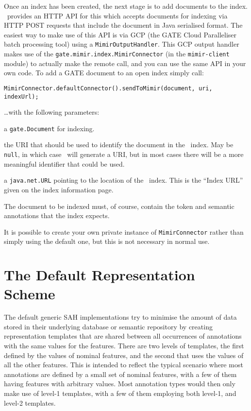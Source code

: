 Once an index has been created, the next stage is to add documents to the
index.  \Mimir\ provides an HTTP API for this which accepts documents for
indexing via HTTP POST requests that include the document in Java serialised
format.  The easiest way to make use of this API is via GCP (the GATE Cloud
Paralleliser batch processing tool) using a \lstinline!MimirOutputHandler!.
This GCP output handler makes use of the
\lstinline!gate.mimir.index.MimirConnector! (in the {\tt mimir-client} module)
to actually make the remote call, and you can use the same API in your own
code.  To add a GATE document to an open index simply call:
\begin{lstlisting}[breaklines]
MimirConnector.defaultConnector().sendToMimir(document, uri, indexUrl);
\end{lstlisting}
%
\ldots{}with the following parameters:
\bde
\item[document] a \lstinline!gate.Document! for indexing.
\item[uri] the URI that should be used to identify the document in the \Mimir\
  index.  May be \lstinline!null!, in which case \Mimir\ will generate a URI,
  but in most cases there will be a more meaningful identifier that could be
  used.
\item[indexUrl] a \lstinline!java.net.URL! pointing to the location of the
  \Mimir\ index.  This is the ``Index URL'' given on the index information page.
\ede

The document to be indexed must, of course, contain the token and semantic
annotations that the index expects.

It is possible to create your own private instance of
\lstinline!MimirConnector! rather than simply using the default one, but this
is not necessary in normal use.

\section{The Default Representation Scheme}\label{sec:indexing:dsah-detail}

The default generic SAH implementations try to minimise the amount of data
stored in their underlying database or semantic repository by creating
representation templates that are shared between all occurrences of annotations
with the same values for the features. There are two levels of templates, the
first defined by the values of nominal features, and the second that uses the
values of all the other features. This is intended to reflect the typical
scenario where most annotations are defined by a small set of nominal features,
with a few of them having features with arbitrary values. Most annotation types
would then only make use of level-1 templates, with a few of them employing both
level-1, and level-2 templates.

